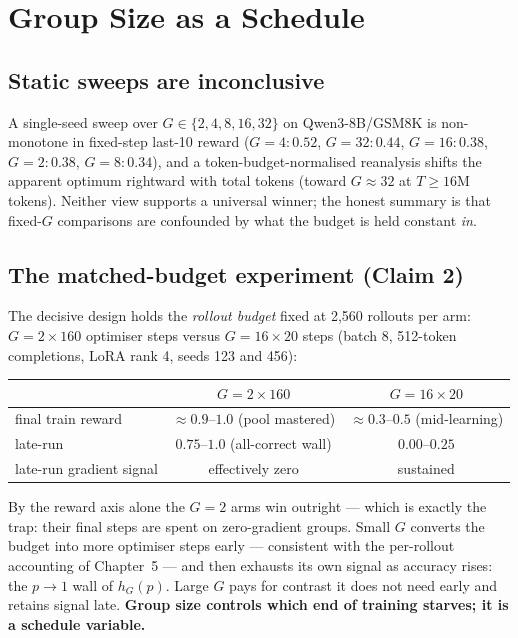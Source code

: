 \chapter{Group Size as a Schedule}
\label{ch:groupsize}

\section{Static sweeps are inconclusive}
A single-seed sweep over $G\in\{2,4,8,16,32\}$ on Qwen3-8B/GSM8K is
non-monotone in fixed-step last-10 reward ($G{=}4{:}0.52$, $G{=}32{:}0.44$,
$G{=}16{:}0.38$, $G{=}2{:}0.38$, $G{=}8{:}0.34$), and a token-budget-normalised
reanalysis shifts the apparent optimum rightward with total tokens (toward
$G\approx32$ at $T\ge16$M tokens). Neither view supports a universal winner;
the honest summary is that fixed-$G$ comparisons are confounded by what the
budget is held constant \emph{in}.

\section{The matched-budget experiment (Claim 2)}
The decisive design holds the \emph{rollout budget} fixed at 2{,}560 rollouts
per arm: $G{=}2\times160$ optimiser steps versus $G{=}16\times20$ steps
(batch 8, 512-token completions, LoRA rank 4, seeds 123 and 456):
\begin{center}
\begin{tabular}{@{}lcc@{}}
\toprule
 & $G{=}2\times160$ & $G{=}16\times20$ \\
\midrule
final train reward & $\approx 0.9$--$1.0$ (pool mastered) & $\approx 0.3$--$0.5$ (mid-learning) \\
late-run \ZVF{} & $0.75$--$1.0$ (all-correct wall) & $0.00$--$0.25$ \\
late-run gradient signal & effectively zero & sustained \\
\bottomrule
\end{tabular}
\end{center}
By the reward axis alone the $G{=}2$ arms win outright --- which is exactly
the trap: their final steps are spent on zero-gradient groups.
Small $G$ converts the budget into more optimiser steps early --- consistent
with the per-rollout accounting of Chapter~5 --- and then exhausts its own
signal as accuracy rises: the $p\to1$ wall of $h_G(p)$. Large $G$ pays for
contrast it does not need early and retains signal late. \textbf{Group size
controls which end of training starves; it is a schedule variable.}

